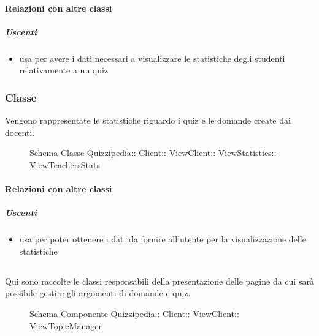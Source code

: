 \paragraph{Relazioni con altre classi}
\subparagraph{Uscenti}
\begin{itemize}
\item usa  per avere i dati necessari a visualizzare le statistiche degli studenti relativamente a un quiz
\end{itemize}
\subsubsection{Classe }
Vengono rappresentate le statistiche riguardo i quiz e le domande create dai docenti.
\begin{figure}[H]
\centering
\noindent{}
\caption[Schema Classe ViewTeachersStats]{Schema Classe Quizzipedia:: Client:: ViewClient:: ViewStatistics:: ViewTeachersStats}
\end{figure}
\paragraph{Relazioni con altre classi}
\subparagraph{Uscenti}
\begin{itemize}
\item usa  per poter ottenere i dati da fornire all'utente per la visualizzazione delle statistiche
\end{itemize}
\subsection{}
Qui sono raccolte le classi responsabili della presentazione delle pagine da cui sarà possibile gestire gli argomenti di domande e quiz.
\begin{figure}[H]
\centering
\noindent{}
\caption[Schema Componente ViewTopicManager]{Schema Componente Quizzipedia:: Client:: ViewClient:: ViewTopicManager}
\end{figure}
